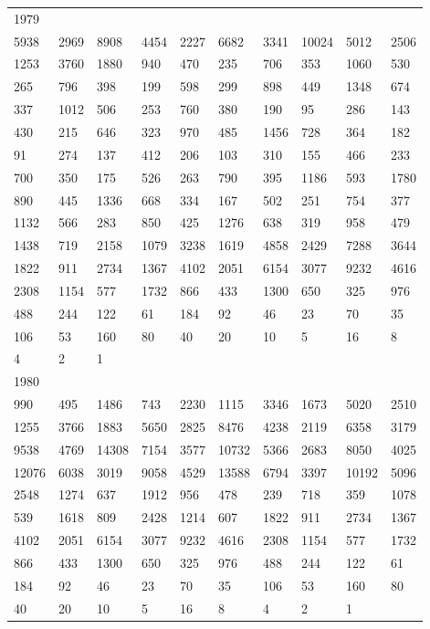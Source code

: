 \begin{longtable}{*{10}{l}}
1979&&&&&&&&&\\
5938& 2969& 8908& 4454& 2227& 6682& 3341& 10024& 5012& 2506\\
1253& 3760& 1880& 940& 470& 235& 706& 353& 1060& 530\\
265& 796& 398& 199& 598& 299& 898& 449& 1348& 674\\
337& 1012& 506& 253& 760& 380& 190& 95& 286& 143\\
430& 215& 646& 323& 970& 485& 1456& 728& 364& 182\\
91& 274& 137& 412& 206& 103& 310& 155& 466& 233\\
700& 350& 175& 526& 263& 790& 395& 1186& 593& 1780\\
890& 445& 1336& 668& 334& 167& 502& 251& 754& 377\\
1132& 566& 283& 850& 425& 1276& 638& 319& 958& 479\\
1438& 719& 2158& 1079& 3238& 1619& 4858& 2429& 7288& 3644\\
1822& 911& 2734& 1367& 4102& 2051& 6154& 3077& 9232& 4616\\
2308& 1154& 577& 1732& 866& 433& 1300& 650& 325& 976\\
488& 244& 122& 61& 184& 92& 46& 23& 70& 35\\
106& 53& 160& 80& 40& 20& 10& 5& 16& 8\\
4& 2& 1& \\

1980&&&&&&&&&\\
990& 495& 1486& 743& 2230& 1115& 3346& 1673& 5020& 2510\\
1255& 3766& 1883& 5650& 2825& 8476& 4238& 2119& 6358& 3179\\
9538& 4769& 14308& 7154& 3577& 10732& 5366& 2683& 8050& 4025\\
12076& 6038& 3019& 9058& 4529& 13588& 6794& 3397& 10192& 5096\\
2548& 1274& 637& 1912& 956& 478& 239& 718& 359& 1078\\
539& 1618& 809& 2428& 1214& 607& 1822& 911& 2734& 1367\\
4102& 2051& 6154& 3077& 9232& 4616& 2308& 1154& 577& 1732\\
866& 433& 1300& 650& 325& 976& 488& 244& 122& 61\\
184& 92& 46& 23& 70& 35& 106& 53& 160& 80\\
40& 20& 10& 5& 16& 8& 4& 2& 1& \\


\end{longtable}
